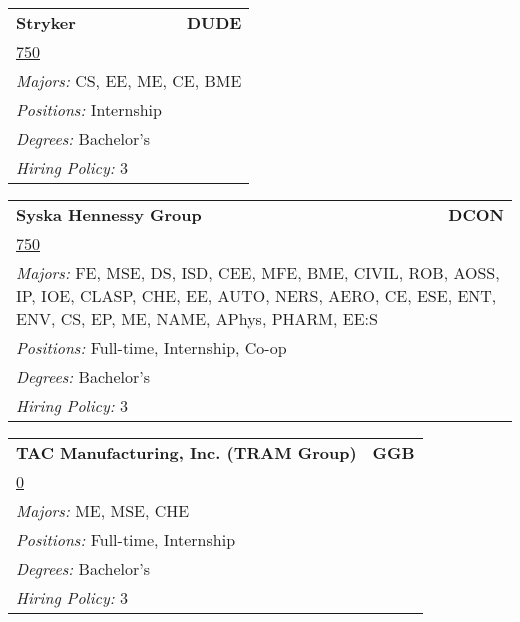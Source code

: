 \documentclass[twoside]{article}
\begin{document}
\begin{center}
\begin{multicols}{3}
\begin{FlushLeft}
\begin{minipage}{\columnwidth}\begin{tabularx}{.95\columnwidth}{Xr}
                 {\Large\bf Stryker} & {\Large\bf DUDE}\\
    \multicolumn{2}{p{.95\columnwidth}}{\url{750}}\\
    \multicolumn{2}{p{.95\columnwidth}}{\emph{Majors:} CS, EE, ME, CE, BME}\\
    \multicolumn{2}{p{.95\columnwidth}}{\emph{Positions:} Internship}\\
    \multicolumn{2}{p{.95\columnwidth}}{\emph{Degrees:} Bachelor's}\\
    \multicolumn{2}{p{.95\columnwidth}}{\emph{Hiring Policy:} 3}\\
    \end{tabularx}
    
\end{minipage}
 
\begin{minipage}{\columnwidth}\begin{tabularx}{.95\columnwidth}{Xr}
                 {\Large\bf Syska Hennessy Group} & {\Large\bf DCON}\\
    \multicolumn{2}{p{.95\columnwidth}}{\url{750}}\\
    \multicolumn{2}{p{.95\columnwidth}}{\emph{Majors:} FE, MSE, DS, ISD, CEE, MFE, BME, CIVIL, ROB, AOSS, IP, IOE, CLASP, CHE, EE, AUTO, NERS, AERO, CE, ESE, ENT, ENV, CS, EP, ME, NAME, APhys, PHARM, EE:S}\\
    \multicolumn{2}{p{.95\columnwidth}}{\emph{Positions:} Full-time, Internship, Co-op}\\
    \multicolumn{2}{p{.95\columnwidth}}{\emph{Degrees:} Bachelor's}\\
    \multicolumn{2}{p{.95\columnwidth}}{\emph{Hiring Policy:} 3}\\
    \end{tabularx}
    
\end{minipage}
 
\begin{minipage}{\columnwidth}\begin{tabularx}{.95\columnwidth}{Xr}
                 {\Large\bf TAC Manufacturing, Inc. (TRAM Group)} & {\Large\bf GGB}\\
    \multicolumn{2}{p{.95\columnwidth}}{\url{0}}\\
    \multicolumn{2}{p{.95\columnwidth}}{\emph{Majors:} ME, MSE, CHE}\\
    \multicolumn{2}{p{.95\columnwidth}}{\emph{Positions:} Full-time, Internship}\\
    \multicolumn{2}{p{.95\columnwidth}}{\emph{Degrees:} Bachelor's}\\
    \multicolumn{2}{p{.95\columnwidth}}{\emph{Hiring Policy:} 3}\\
    \end{tabularx}
    

\end{minipage}
\end{FlushLeft}
\end{multicols}
\end{center}
\end{document}
